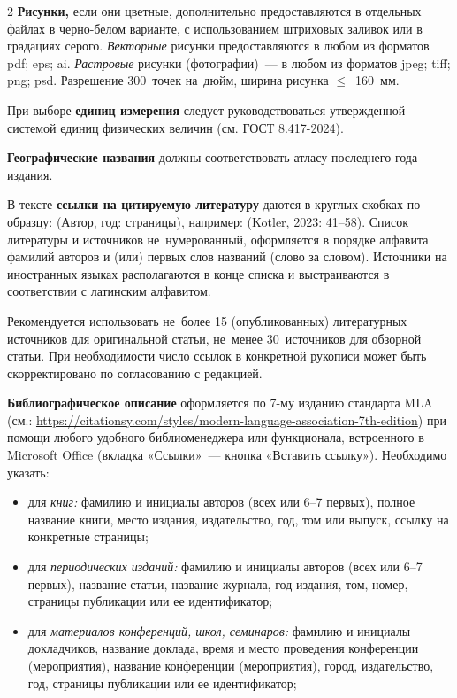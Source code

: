 \begin{multicols}{2}
\textbf{Рисунки,} если они цветные, дополнительно предоставляются в
отдельных файлах в черно-белом варианте, с использованием штриховых
заливок или в градациях серого. \emph{Векторные} рисунки предоставляются
в любом из форматов pdf; eps; ai. \emph{Растровые} рисунки (фотографии)~— в любом из форматов jpeg; tiff; png; psd. Разрешение 300~точек на~дюйм, ширина рисунка \(\leqslant\)~160~мм.

При выборе \textbf{единиц измерения} следует руководствоваться
утвержденной системой единиц физических величин (см. ГОСТ 8.417-2024).

\textbf{Географические названия} должны соответствовать атласу
последнего года издания.

В тексте \textbf{ссылки на цитируемую литературу} даются в круглых
скобках по образцу: (Автор, год: страницы), например: (Kotler, 2023:
41--58). Список литературы и источников не~нумерованный, оформляется в
порядке алфавита фамилий авторов и (или) первых слов названий (слово за
словом). Источники на иностранных языках располагаются в конце списка и
выстраиваются в соответствии с латинским алфавитом.

Рекомендуется использовать не~более 15 (опубликованных) литературных
источников для оригинальной статьи, не~менее 30~источников для обзорной
статьи. При необходимости число ссылок в конкретной рукописи может быть
скорректировано по согласованию с редакцией.

\textbf{Библиографическое описание} оформляется по 7-му изданию
стандарта MLA (см.:
\url{https://citationsy.com/styles/modern-language-association-7th-edition})
при помощи любого удобного библиоменеджера или функционала, встроенного
в Microsoft Office (вкладка «Ссылки»~— кнопка «Вставить ссылку»).
Необходимо указать:
\begin{itemize}
\item для \emph{книг:} фамилию и инициалы авторов (всех или 6--7 первых),
полное название книги, место издания, издательство, год, том или выпуск,
ссылку на конкретные страницы;

\item  для \emph{периодических изданий:} фамилию и инициалы авторов (всех
или 6--7 первых), название статьи, название журнала, год издания, том,
номер, страницы публикации или ее идентификатор;

\item  для \emph{материалов конференций, школ, семинаров:} фамилию и
инициалы докладчиков, название доклада, время и место проведения
конференции (мероприятия), название конференции (мероприятия), город,
издательство, год, страницы публикации или ее идентификатор;


\end{itemize}
\end{multicols}
